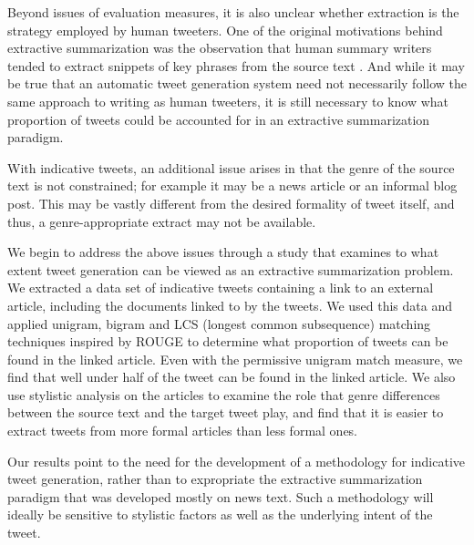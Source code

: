 Beyond issues of evaluation measures, it is also unclear whether extraction is the strategy employed by human tweeters. One of the original motivations behind extractive summarization was the observation that human summary writers tended to extract snippets of key phrases from the source text \cite{mani-2001}.  And while it may be true that an automatic tweet generation system need not necessarily follow the same approach to writing as human tweeters, it is still necessary to know what proportion of tweets could be accounted for in an extractive summarization paradigm.

With indicative tweets, an additional issue arises in that the genre of the source text is not constrained; for example it may be a news article or an informal blog post. This may be vastly different from the desired formality of tweet itself, and thus, a genre-appropriate extract may not be available.

We begin to address the above issues through a study that examines to what extent tweet generation can be viewed as an extractive summarization problem. We extracted a data set of indicative tweets containing a link to an external article, including the documents linked to by the tweets. We used this data and applied unigram, bigram and LCS (longest common subsequence) matching techniques inspired by ROUGE to determine what proportion of tweets can be found in the linked article. Even with the permissive unigram match measure, we find that well under half of the tweet can be found in the linked article. We also use stylistic analysis on the articles to examine the role that genre differences between the source text and the target tweet play, and find that it is easier to extract tweets from more formal articles than less formal ones.

Our results point to the need for the development of a methodology for indicative tweet generation, rather than to expropriate the extractive summarization paradigm that was developed mostly on news text. Such a methodology will ideally be sensitive to stylistic factors as well as the underlying intent of the tweet.
